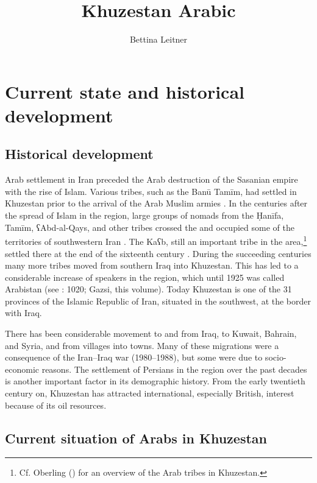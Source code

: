 \documentclass[output=paper,nonflat]{langsci/langscibook}
\author{Bettina Leitner\affiliation{University of Vienna}}
\title{Khuzestan Arabic}
\begin{document}
\maketitle  

\section{Current state and historical development} 
\subsection{Historical development}
Arab settlement in Iran preceded the Arab destruction of the Sasanian empire with the rise of Islam. Various tribes, such as the Banū Tamīm, had settled in Khuzestan prior to the arrival of the Arab Muslim armies \citep[211]{Daniel1986}. In the centuries after the spread of Islam in the region, large groups of nomads from the Ḥanīfa, Tamīm, ʕAbd-al-Qays, and other tribes crossed the   and occupied some of the territories of southwestern Iran \citep[215]{Oberling1986}. The Kaʕb, still an important tribe in the area,\footnote{Cf. Oberling (\citeyear[218]{Oberling1986}) for an overview of the Arab tribes in Khuzestan.} settled there at the end of the sixteenth century \citep[216]{Oberling1986}. During the succeeding centuries many more tribes moved from southern Iraq into Khuzestan. This has led to a considerable increase of  speakers in the region, which until 1925 was called Arabistan (see \citealt{Gazsi2011}: 1020; Gazsi, this volume). Today Khuzestan is one of the 31 provinces of the Islamic Republic of Iran, situated in the southwest, at the border with Iraq. 

There has been considerable movement to and from Iraq, to Kuwait, Bahrain, and Syria, and from villages into towns. Many of these migrations were a consequence of the Iran–Iraq war (1980–1988), but some were due to socio-economic reasons. The settlement of Persians in the region over the past decades \citep[1020]{Gazsi2011} is another important factor in its demographic history. From the early twentieth century on, Khuzestan has attracted international, especially British, interest because of its oil resources. 

\subsection{Current situation of Arabs in Khuzestan}
\end{document}
